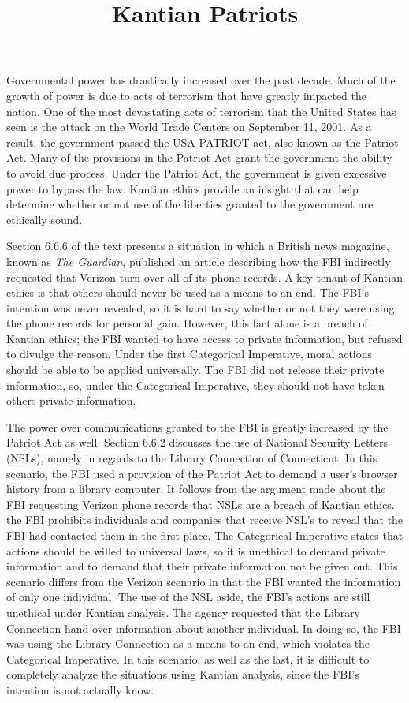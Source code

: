 \documentclass{paper}
\title{Kantian Patriots}
\begin{document}
 \finalh{} \inlinetitle \begin{linenumbers}

Governmental power has drastically increased over the past decade. Much of the growth of power is
due to acts of terrorism that have greatly impacted the nation. One of the most devastating acts of
terrorism that the United States has seen is the attack on the World Trade Centers on September 11,
2001. As a result, the government passed the USA PATRIOT act, also known as the Patriot Act. Many of
the provisions in the Patriot Act grant the government the ability to avoid due process. Under the
Patriot Act, the government is given excessive power to bypass the law. Kantian ethics provide an
insight that can help determine whether or not use of the liberties granted to the government are
ethically sound.

Section 6.6.6 of the text presents a situation in which a British news magazine, known as
\textit{The Guardian}, published an article describing how the FBI indirectly requested that Verizon
turn over all of its phone records. A key tenant of Kantian ethics is that others should never be
used as a means to an end. The FBI's intention was never revealed, so it is hard to say whether or
not they were using the phone records for personal gain. However, this fact alone is a breach of
Kantian ethics; the FBI wanted to have access to private information, but refused to divulge the
reason. Under the first Categorical Imperative, moral actions should be able to be applied
universally. The FBI did not release their private information, so, under the Categorical
Imperative, they should not have taken others private information.

The power over communications granted to the FBI is greatly increased by the Patriot Act as well.
Section 6.6.2 discusses the use of National Security Letters (NSLs), namely in regards to the
Library Connection of Connecticut. In this scenario, the FBI used a provision of the Patriot Act to
demand a user's browser history from a library computer. It follows from the argument made about the
FBI requesting Verizon phone records that NSLs are a breach of Kantian ethics. the FBI prohibits
individuals and companies that receive NSL's to reveal that the FBI had contacted them in the first
place. The Categorical Imperative states that actions should be willed to universal laws, so it is
unethical to demand private information and to demand that their private information not be given
out. This scenario differs from the Verizon scenario in that the FBI wanted the information of only
one individual. The use of the NSL aside, the FBI's actions are still unethical under Kantian
analysis. The agency requested that the Library Connection hand over information about another
individual. In doing so, the FBI was using the Library Connection as a means to an end, which
violates the Categorical Imperative. In this scenario, as well as the last, it is difficult to
completely analyze the situations using Kantian analysis, since the FBI's intention is not actually
know.


\end{linenumbers}
\end{document}
